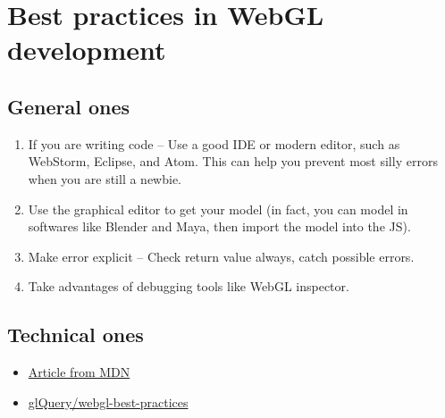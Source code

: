 \section{Best practices in WebGL
development}\label{best-practices-in-webgl-development}

\subsection{General ones}\label{general-ones}

\begin{enumerate}
\def\labelenumi{\arabic{enumi}.}
\tightlist
\item
  If you are writing code -- Use a good IDE or modern editor, such as
  WebStorm, Eclipse, and Atom. This can help you prevent most silly
  errors when you are still a newbie.
\item
  Use the graphical editor to get your model (in fact, you can model in
  softwares like Blender and Maya, then import the model into the JS).
\item
  Make error explicit -- Check return value always, catch possible
  errors.
\item
  Take advantages of debugging tools like WebGL inspector.
\end{enumerate}

\subsection{Technical ones}\label{technical-ones}

\begin{itemize}
\tightlist
\item
  \href{https://developer.mozilla.org/en-US/docs/Web/API/WebGL_API/WebGL_best_practices}{Article
  from MDN}
\item
  \href{https://github.com/glQuery/webgl-best-practices}{glQuery/webgl-best-practices}
\end{itemize}
